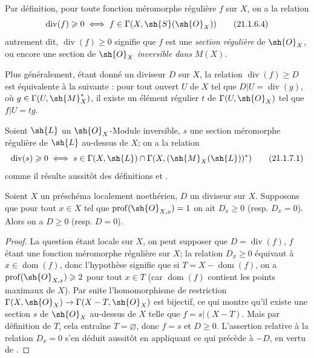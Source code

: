 Par définition, pour toute fonction méromorphe régulière $f$ sur $X$, on a la relation
\[
\label{IV.21.1.6.4}
  \operatorname{div}(f)\geq0 \iff f\in\Gamma(X,\sh{S}(\sh{O}_X))
  \tag{21.1.6.4}
\]
autrement dit, $\operatorname{div}(f)\geq0$ signifie que $f$ est une \emph{section régulière} de $\sh{O}_X$, ou encore une section de $\sh{O}_X$ \emph{inversible dans} $M(X)$.

Plus généralement, étant donné un diviseur $D$ sur $X$, la relation $\operatorname{div}(f)\geq D$ est équivalente à la suivante : pour tout ouvert $U$ de $X$ tel que $D|U=\operatorname{div}(g)$, où $g\in\Gamma(U,\sh{M}_X^*)$, il existe un élément régulier $t$ de $\Gamma(U,\sh{O}_X)$ tel que $f|U=tg$.

\begin{env}[21.1.7]
\label{IV.21.1.7}
Soient $\sh{L}$ un $\sh{O}_X$-Module inversible, $s$ une section méromorphe régulière de $\sh{L}$ au-dessus de $X$; on a la relation
\[
\label{IV.21.1.7.1}
  \operatorname{div}(s)\geq0 \iff s\in\Gamma(X,\sh{L})\cap\Gamma(X,(\sh{M}_X(\sh{L}))^*)
  \tag{21.1.7.1}
\]
comme il résulte aussitôt des définitions  et .
\end{env}

\begin{proposition}[21.1.8]
\label{IV.21.1.8}
Soient $X$ un préschéma localement noethérien, $D$ un diviseur sur $X$.
Supposons que pour tout $x\in X$ tel que $\operatorname{prof}(\sh{O}_{X,x})=1$ on ait $D_x\geq0$ (resp. $D_x=0$).
Alors on a $D\geq0$ (resp. $D=0$).
\end{proposition}

\begin{proof}
La question étant locale sur $X$, on peut supposer que $D=\operatorname{div}(f)$, $f$ étant une
fonction méromorphe régulière sur $X$;
la relation $D_x\geq0$ équivaut à $x\in\operatorname{dom}(f)$, donc l'hypothèse signifie que si $T=X-\operatorname{dom}(f)$, on a $\operatorname{prof}(\sh{O}_{X,x})\geq2$ pour tout $x\in T$ (car $\operatorname{dom}(f)$ contient les points maximaux de $X$).
Par suite  l'homomorphisme de restriction $\Gamma(X,\sh{O}_X)\to\Gamma(X-T,\sh{O}_X)$ est bijectif, ce qui montre qu'il existe une section $s$ de $\sh{O}_X$ au-dessus de $X$ telle que $f=s|(X-T)$.
Mais par définition de $T$, cela entraîne $T=\varnothing$, donc $f=s$ et $D\geq0$.
L'assertion relative à la relation $D_x=0$ s'en déduit aussitôt en appliquant ce qui précède à $-D$, en vertu de .
\end{proof}


